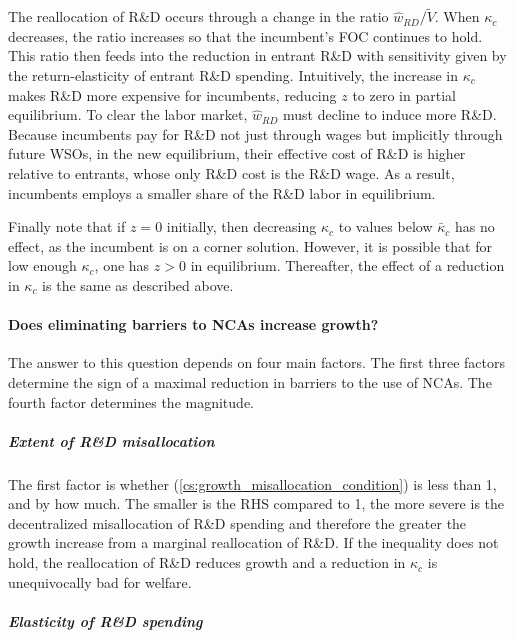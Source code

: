 \documentclass[11pt,english]{article}
\begin{document}
The reallocation of R\&D occurs through a change in the ratio $\hat{w}_{RD} / \tilde{V}$. When $\kappa_c$ decreases, the ratio increases so that the incumbent's FOC continues to hold. This ratio then feeds into the reduction in entrant R\&D with sensitivity given by the return-elasticity of entrant R\&D spending. Intuitively, the increase in $\kappa_c$ makes R\&D more expensive for incumbents, reducing $z$ to zero in partial equilibrium. To clear the labor market, $\hat{w}_{RD}$ must decline to induce more R\&D. Because incumbents pay for R\&D not just through wages but implicitly through future WSOs, in the new equilibrium, their effective cost of R\&D is higher relative to entrants, whose only R\&D cost is the R\&D wage. As a result, incumbents employs a smaller share of the R\&D labor in equilibrium.

Finally note that if $z = 0$ initially, then decreasing $\kappa_{c}$ to values below $\bar{\kappa}_c$ has no effect, as the incumbent is on a corner solution. However, it is possible that for low enough $\kappa_c$, one has $z > 0$ in equilibrium. Thereafter, the effect of a reduction in $\kappa_c$ is the same as described above.

\paragraph{Does eliminating barriers to NCAs increase growth?}

The answer to this question depends on four main factors. The first three factors determine the sign of a maximal reduction in barriers to the use of NCAs. The fourth factor determines the magnitude.

\subparagraph{Extent of R\&D misallocation} The first factor is whether (\ref{cs:growth_misallocation_condition}) is less than 1, and by how much. The smaller is the RHS compared to 1, the more severe is the decentralized misallocation of R\&D spending and therefore the greater the growth increase from a marginal reallocation of R\&D. If the inequality does not hold, the reallocation of R\&D reduces growth and a reduction in $\kappa_c$ is unequivocally bad for welfare. 

\subparagraph{Elasticity of R\&D spending}
\end{document}
